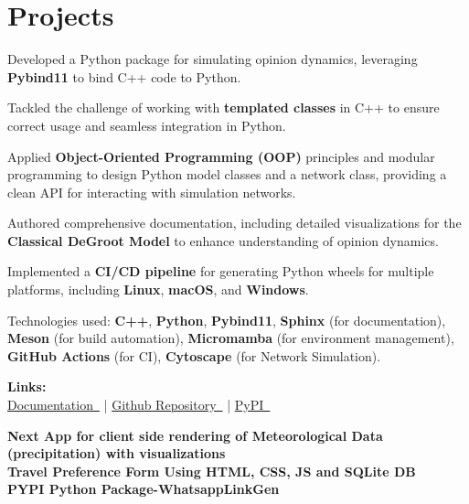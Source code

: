\documentclass[]{resume}
\begin{document}
\begin{minipage}[t]{0.60\textwidth}
\section{Projects}

\location{}
\begin{tightemize}
\item Developed a Python package for simulating opinion dynamics, leveraging \textbf{Pybind11} to bind C++ code to Python.
\item Tackled the challenge of working with \textbf{templated classes} in C++ to ensure correct usage and seamless integration in Python.
\item Applied \textbf{Object-Oriented Programming (OOP)} principles and modular programming to design Python model classes and a network class, providing a clean API for interacting with simulation networks.
\item Authored comprehensive documentation, including detailed visualizations for the \textbf{Classical DeGroot Model} to enhance understanding of opinion dynamics.
\item Implemented a \textbf{CI/CD pipeline} for generating Python wheels for multiple platforms, including \textbf{Linux}, \textbf{macOS}, and \textbf{Windows}.
\item Technologies used: \textbf{C++}, \textbf{Python}, \textbf{Pybind11}, \textbf{Sphinx} (for documentation), \textbf{Meson} (for build automation), \textbf{Micromamba} (for environment management), \textbf{GitHub Actions} (for CI), \textbf{Cytoscape} (for Network Simulation).
\item \textbf{Links: } \\
\href{https://seldon-code.github.io/pyseldonlib/}{Documentation\faLink\ } | 
\href{https://github.com/seldon-code/pyseldonlib}{Github Repository\faLink\ } | 
\href{https://pypi.org/project/pyseldonlib/}{PyPI\faLink\ }
\end{tightemize}
\sectionsep

\small{
\textbf{Next App for client side rendering of Meteorological Data (precipitation) with visualizations\href{https://github.com/User-DK/Demo-Met-Data-vis}{\faLink}}  \\
\vspace{0.4em}
\textbf{Travel Preference Form Using HTML, CSS, JS and SQLite DB\href{https://github.com/User-DK/Travel-preference-form}{\faLink}} \\
\vspace{0.4em}
\textbf{PYPI Python Package-WhatsappLinkGen\href{https://pypi.org/project/whatsapplinkgen/}{\faLink}}}
\sectionsep


\end{minipage}
\end{document}
